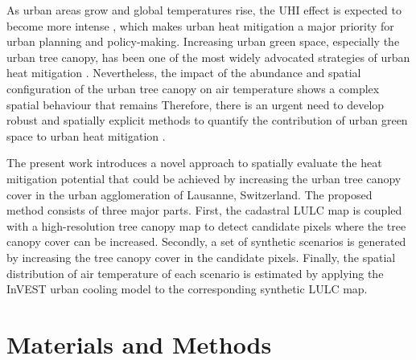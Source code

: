 \documentclass[10pt,letterpaper]{article}
\begin{document}
As urban areas grow and global temperatures rise, the UHI effect is expected to become more intense \cite{meehl2004more,huang2019projecting}, which makes urban heat mitigation a major priority for urban planning and policy-making.
Increasing urban green space, especially the urban tree canopy, has been one of the most widely advocated strategies of urban heat mitigation \cite{bowler2010urban,phelan2015urban,koc2018evaluating}.
Nevertheless, the impact of the abundance and spatial configuration of the urban tree canopy on air temperature shows a complex spatial behaviour that remains
Therefore, there is an urgent need to develop robust and spatially explicit methods to quantify the contribution of urban green space to urban heat mitigation \cite{haaland2015challenges,artmann2019urban}.


The present work introduces a novel approach to spatially evaluate the heat mitigation potential that could be achieved by increasing the urban tree canopy cover in the urban agglomeration of Lausanne, Switzerland. The proposed method consists of three major parts.
First, the cadastral LULC map is coupled with a high-resolution tree canopy map to detect candidate pixels where the tree canopy cover can be increased.
Secondly, a set of synthetic scenarios is generated by increasing the tree canopy cover in the candidate pixels.
Finally, the spatial distribution of air temperature of each scenario is estimated by applying the InVEST urban cooling model to the corresponding synthetic LULC map.


\section*{Materials and Methods}
\end{document}
